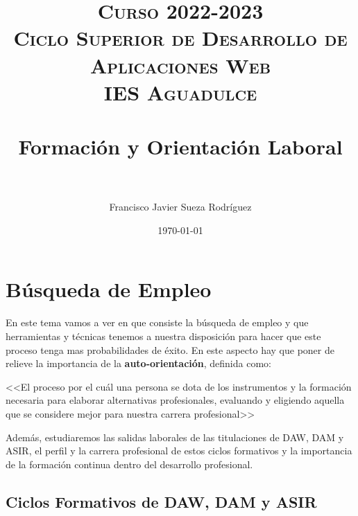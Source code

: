 


\title{	
\normalfont \normalsize 
\textsc{{\bfseries Curso 2022-2023} \\ Ciclo Superior de Desarrollo de Aplicaciones Web \\ IES Aguadulce} \\ [25pt] 
\horrule{0.5pt} \\[0.4cm] 
\huge Formación y Orientación Laboral \\ 
\horrule{0.5pt} \\[0.4cm] 
}

\author{Francisco Javier Sueza Rodríguez} 
\date{\normalsize\today} 




\maketitle

\newpage 

\tableofcontents 



\newpage

\chapter{Búsqueda de Empleo}
En este tema vamos a ver en que consiste la búsqueda de empleo y que herramientas y técnicas tenemos a nuestra disposición para hacer que este proceso tenga mas probabilidades de éxito. En este aspecto hay que poner de relieve la importancia de la {\bfseries auto-orientación}, definida como:

 <<El proceso por el cuál una persona se dota de los instrumentos y la formación necesaria para elaborar alternativas profesionales, evaluando y eligiendo aquella que se considere mejor para nuestra carrera profesional>>\cite{apuntes01}
 
 Además, estudiaremos las salidas laborales de las titulaciones de DAW, DAM y ASIR, el perfil y la carrera profesional de estos ciclos formativos y la importancia de la formación continua dentro del desarrollo profesional.  
 
 \section{Ciclos Formativos de DAW, DAM y ASIR}
 
	



 

 
 
 
  
 

